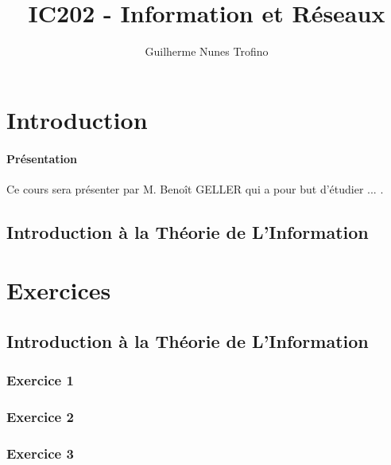 \documentclass{article}
\title{IC202 - Information et Réseaux}
\author{Guilherme Nunes Trofino}
\begin{document}
\maketitle

\newpage\tableofcontents

\section{Introduction}
\paragraph{Présentation}Ce cours sera présenter par M. Benoît GELLER qui a pour but d'étudier ... .

\subsection{Introduction à la Théorie de L'Information}


\section{Exercices}

\subsection{Introduction à la Théorie de L'Information}
\subsubsection{Exercice 1}
\begin{resolution}
        
\end{resolution}

\subsubsection{Exercice 2}
\begin{resolution}
    
\end{resolution}

\subsubsection{Exercice 3}
\begin{resolution}
    
\end{resolution}
\end{document}
